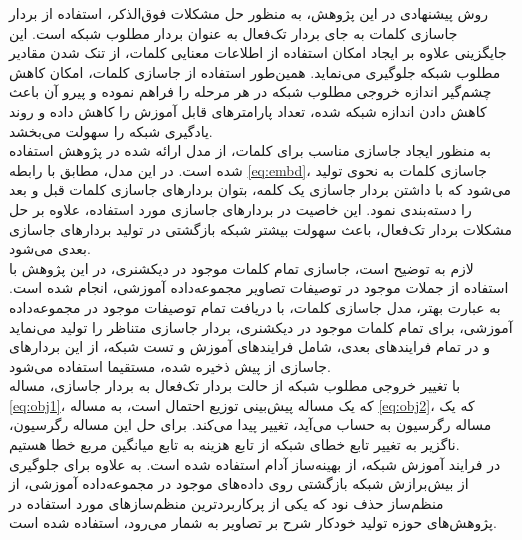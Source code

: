 روش پیشنهادی در این پژوهش، به منظور حل مشکلات فوق‌الذکر، استفاده از بردار جاسازی کلمات به جای بردار تک‌فعال به عنوان بردار مطلوب شبکه است. این جایگزینی علاوه بر ایجاد امکان استفاده از اطلاعات معنایی کلمات، از تنک شدن مقادیر مطلوب شبکه جلوگیری می‌نماید. همین‌طور استفاده از جاسازی کلمات، امکان کاهش چشم‌گیر اندازه خروجی مطلوب شبکه در هر مرحله را فراهم نموده و پیرو آن باعث کاهش دادن اندازه شبکه شده، تعداد پارامترهای قابل آموزش را کاهش داده و روند یادگیری شبکه را سهولت می‌بخشد.
\\
به منظور ایجاد جاسازی مناسب برای کلمات، از مدل  ارائه شده در پژوهش \cite{mikolov2013distributed} استفاده شده است. در این مدل، مطابق با رابطه \eqref{eq:embd}، جاسازی کلمات به نحوی تولید می‌شود که با داشتن بردار جاسازی یک کلمه، بتوان بردارهای جاسازی کلمات قبل و بعد را دسته‌بندی نمود. این خاصیت در بردارهای جاسازی مورد استفاده، علاوه بر حل مشکلات بردار تک‌فعال، باعث سهولت بیشتر شبکه بازگشتی در تولید بردارهای جاسازی بعدی می‌شود.
\\
لازم به توضیح است، جاسازی تمام کلمات موجود در دیکشنری، در این پژوهش با استفاده از جملات موجود در توصیفات تصاویر مجموعه‌داده آموزشی، انجام شده است. به عبارت بهتر، مدل جاسازی کلمات، با دریافت تمام توصیفات موجود در مجموعه‌داده آموزشی، برای تمام کلمات موجود در دیکشنری، بردار جاسازی متناظر را تولید می‌نماید و در تمام فرایندهای بعدی، شامل فرایند‌های آموزش و تست شبکه، از این بردارهای جاسازی از پیش ذخیره شده، مستقیما استفاده می‌شود.
\\
با تغییر خروجی مطلوب شبکه از حالت بردار تک‌فعال به بردار جاسازی، مساله \eqref{eq:obj1}، که یک مساله پیش‌بینی توزیع احتمال است، به مساله \eqref{eq:obj2}، که یک مساله رگرسیون به حساب می‌آید، تغییر پیدا می‌کند. برای حل این مساله رگرسیون، ناگزیر به تغییر تابع خطای شبکه از تابع هزینه  به تابع میانگین مربع خطا هستیم.
\\
در فرایند آموزش شبکه، از بهینه‌ساز آدام استفاده شده است. به علاوه برای جلوگیری از بیش‌برازش شبکه بازگشتی روی داده‌های موجود در مجموعه‌داده آموزشی، از منظم‌ساز حذف نود که یکی از پرکاربردترین منظم‌ساز‌های مورد استفاده در پژوهش‌های حوزه تولید خودکار شرح بر تصاویر به شمار می‌رود، استفاده شده است.



